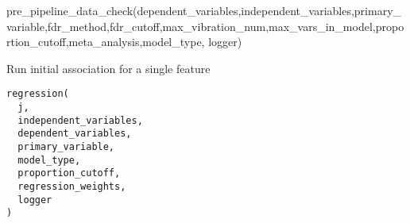 \documentclass[a4paper]{book}
\begin{document}
%
\begin{Examples}
\begin{ExampleCode}
pre_pipeline_data_check(dependent_variables,independent_variables,primary_variable,fdr_method,fdr_cutoff,max_vibration_num,max_vars_in_model,proportion_cutoff,meta_analysis,model_type, logger)
\end{ExampleCode}
\end{Examples}
%
\begin{Description}\relax
Run initial association for a single feature
\end{Description}
%
\begin{Usage}
\begin{verbatim}
regression(
  j,
  independent_variables,
  dependent_variables,
  primary_variable,
  model_type,
  proportion_cutoff,
  regression_weights,
  logger
)
\end{verbatim}
\end{Usage}
%
\end{document}
